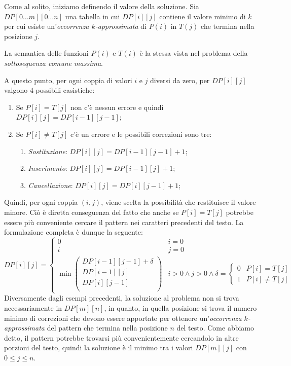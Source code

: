 \bigskip\noindent
Come al solito, iniziamo definendo il valore della soluzione. Sia $DP[0\dots m]
[0\dots n]$ una tabella in cui $DP[i][j]$ contiene il valore minimo di $k$ per
cui esiste un'\emph{occorrenza $k$-approssimata} di $P(i)$ in $T(j)$ che termina
nella posizione $j$.
\begin{note}
    La semantica delle funzioni $P(i)$ e $T(i)$ è la stessa vista nel problema
    della \emph{sottosequenza comune massima}.
\end{note}\noindent
A questo punto, per ogni coppia di valori $i$ e $j$ diversi da zero, per
$DP[i][j]$ valgono 4 possibili casistiche:
\begin{enumerate}
    \item Se $P[i]=T[j]$ non c'è nessun errore e quindi $DP[i][j]=DP[i-1][j-1]$;
    \item Se $P[i]\neq T[j]$ c'è un errore e le possibili correzioni sono tre:
    \begin{enumerate}
        \item \emph{Sostituzione}: $DP[i][j]=DP[i-1][j-1]+1$;
        \item \emph{Inserimento}: $DP[i][j]=DP[i-1][j]+1$;
        \item \emph{Cancellazione}: $DP[i][j]=DP[i][j-1]+1$;
    \end{enumerate}
\end{enumerate}
Quindi, per ogni coppia $(i,j)$, viene scelta la possibilità che restituisce il
valore minore. Ciò è diretta conseguenza del fatto che anche se $P[i]=T[j]$
potrebbe essere più conveniente cercare il pattern nei caratteri precedenti del
testo. La formulazione completa è dunque la seguente:
\[DP[i][j]=\begin{cases}
    0 & i=0\\
    i & j=0\\
    \min\left(\begin{array}{l}
        DP[i-1][j-1]+\delta\\
        DP[i-1][j]\\
        DP[i][j-1]\\
    \end{array}\right) & i>0 \wedge j>0\wedge\delta=\begin{cases}
        0 & P[i]=T[j]\\
        1 & P[i]\neq T[j]
    \end{cases}
\end{cases}\]
Diversamente dagli esempi precedenti, la soluzione al problema non si trova
necessariamente in $DP[m][n]$, in quanto, in quella posizione si trova il numero
minimo di correzioni che devono essere apportate per ottenere un'\emph{occorrenza
$k$-approssimata} del pattern che termina nella posizione $n$ del testo. Come
abbiamo detto, il pattern potrebbe trovarsi più convenientemente cercandolo in
altre porzioni del testo, quindi la soluzione è il minimo tra i valori $DP[m][j]$
con $0\leq j\leq n$.

